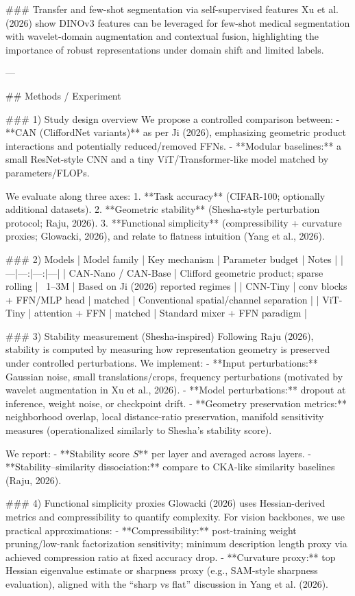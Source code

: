 ### Transfer and few-shot segmentation via self-supervised features  
Xu et al. (2026) show DINOv3 features can be leveraged for few-shot medical segmentation with wavelet-domain augmentation and contextual fusion, highlighting the importance of robust representations under domain shift and limited labels.

---

## Methods / Experiment  

### 1) Study design overview  
We propose a controlled comparison between:  
- **CAN (CliffordNet variants)** as per Ji (2026), emphasizing geometric product interactions and potentially reduced/removed FFNs.  
- **Modular baselines:** a small ResNet-style CNN and a tiny ViT/Transformer-like model matched by parameters/FLOPs.

We evaluate along three axes:  
1. **Task accuracy** (CIFAR-100; optionally additional datasets).  
2. **Geometric stability** (Shesha-style perturbation protocol; Raju, 2026).  
3. **Functional simplicity** (compressibility + curvature proxies; Glowacki, 2026), and relate to flatness intuition (Yang et al., 2026).

### 2) Models  
| Model family | Key mechanism | Parameter budget | Notes |
|---|---:|---:|---|
| CAN-Nano / CAN-Base | Clifford geometric product; sparse rolling | ~1–3M | Based on Ji (2026) reported regimes |
| CNN-Tiny | conv blocks + FFN/MLP head | matched | Conventional spatial/channel separation |
| ViT-Tiny | attention + FFN | matched | Standard mixer + FFN paradigm |

### 3) Stability measurement (Shesha-inspired)  
Following Raju (2026), stability is computed by measuring how representation geometry is preserved under controlled perturbations. We implement:  
- **Input perturbations:** Gaussian noise, small translations/crops, frequency perturbations (motivated by wavelet augmentation in Xu et al., 2026).  
- **Model perturbations:** dropout at inference, weight noise, or checkpoint drift.  
- **Geometry preservation metrics:** neighborhood overlap, local distance-ratio preservation, manifold sensitivity measures (operationalized similarly to Shesha’s stability score).

We report:  
- **Stability score \(S\)** per layer and averaged across layers.  
- **Stability–similarity dissociation:** compare to CKA-like similarity baselines (Raju, 2026).

### 4) Functional simplicity proxies  
Glowacki (2026) uses Hessian-derived metrics and compressibility to quantify complexity. For vision backbones, we use practical approximations:  
- **Compressibility:** post-training weight pruning/low-rank factorization sensitivity; minimum description length proxy via achieved compression ratio at fixed accuracy drop.  
- **Curvature proxy:** top Hessian eigenvalue estimate or sharpness proxy (e.g., SAM-style sharpness evaluation), aligned with the “sharp vs flat” discussion in Yang et al. (2026).  

